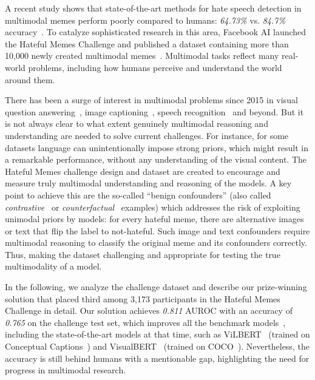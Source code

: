 \documentclass{article}
\begin{document}
  A recent study shows that state-of-the-art methods for hate speech detection in multimodal memes perform poorly compared to humans: \emph{64.73\%} vs. \emph{84.7\%} accuracy~\cite{kiela2020hateful}. To catalyze sophisticated research in this area, Facebook AI launched the Hateful Memes Challenge and published a dataset containing more than 10,000 newly created multimodal memes~\cite{kiela2020hateful}. Multimodal tasks reflect many real-world problems, including how humans perceive and understand the world around them. 
  
  There has been a surge of interest in multimodal problems since 2015 in visual question answering~\cite{antol2015vqa, gurari2018vizwiz}, image captioning~\cite{krishna2017visual, chen2015microsoft}, speech recognition~\cite{srinivasan2020multimodal, paraskevopoulos2020multiresolution} and beyond. But it is not always clear to what extent genuinely multimodal reasoning and understanding are needed to solve current challenges. For instance, for some datasets language can unintentionally impose strong priors, which might result in a remarkable performance, without any understanding of the visual content. The Hateful Memes challenge design and dataset are created to encourage and measure truly multimodal understanding and reasoning of the models. A key point to achieve this are the so-called ``benign confounders'' (also called \textit{contrastive}~\cite{gardner2020evaluating} or \textit{counterfactual}~\cite{kaushik2019learning} examples) which addresses the risk of exploiting unimodal priors by models: for every hateful meme, there are alternative images or text that flip the label to not-hateful. Such image and text confounders require multimodal reasoning to classify the original meme and its confounders correctly. Thus, making the dataset challenging and appropriate for testing the true multimodality of a model.

  In the following, we analyze the challenge dataset and describe our prize-winning solution that placed third among 3,173 participants in the Hateful Memes Challenge in detail. Our solution achieves \emph{0.811} AUROC with an accuracy of \emph{0.765} on the challenge test set, which improves all the benchmark models~\cite{kiela2020hateful}, including the state-of-the-art models at that time, such as ViLBERT~\cite{lu2019vilbert} (trained on Conceptual Captions~\cite{sharma2018conceptual}) and VisualBERT~\cite{li2019visualbert} (trained on COCO~\cite{chen2015microsoft}). Nevertheless, the accuracy is still behind humans with a mentionable gap, highlighting the need for progress in multimodal research.
\end{document}
